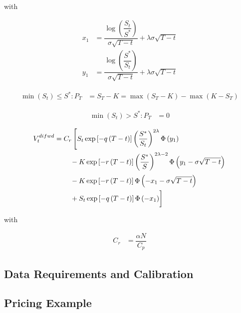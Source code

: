 with

\begin{align*}
x_1 &= \dfrac{\log\left(\dfrac{S_t}{S^*} \right)}{\sigma \sqrt{T-t}} + \lambda \sigma \sqrt{T-t}\\
y_1 &= \dfrac{\log\left(\dfrac{S^*}{S_t} \right)}{\sigma \sqrt{T-t}} + \lambda \sigma \sqrt{T-t}
\end{align*}

\begin{align}
\min\left( S_t\right) \leq S^* : P_T &= S_T -K = \max \left( S_T - K \right) -\max\left( K-S_T \right)
\end{align}

\begin{align}
\min\left( S_t \right) > S^* : P_T &= 0
\end{align}

\begin{align}
    V_t^{difwd} &= C_r \left[ S_t \exp\left[- q \left(T-t\right)\right]\left(\dfrac{S^*}{S_t}\right)^{2 \lambda} \Phi\left(y_1\right) \right.\nonumber\\
   &\qquad \left.\vphantom{\dfrac{S^*}{S_t}} - K \exp\left[- r \left(T-t\right)\right] \left(\dfrac{S^*}{S}\right)^{2 \lambda - 2} \Phi\left(y_1 - \sigma \sqrt{T-t}\right) \right.\nonumber\\
   &\qquad \left.\vphantom{\dfrac{S^*}{S}} - K \exp\left[- r \left(T-t\right)\right] \Phi\left(-x_1 - \sigma \sqrt{T-t}\right) \right.\nonumber\\
   &\qquad \left.\vphantom{\dfrac{S^*}{S}} + S_t \exp\left[- q \left(T-t\right)\right] \Phi\left(- x_1\right) \right]
\end{align}

with 

\begin{align}
C_r &= \dfrac{\alpha N}{C_p}
\end{align}

\subsection{Data Requirements and Calibration}

\subsection{Pricing Example}
